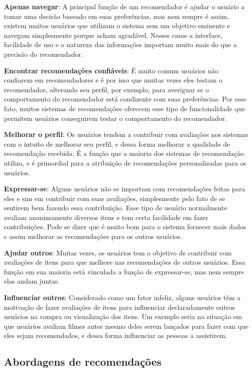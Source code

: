 \textbf{Apenas navegar}: A principal função de um recomendador é ajudar o usuário a tomar uma decisão baseado em suas preferências, mas nem sempre é assim, existem muitos usuários que utilizam o sistema sem um objetivo eminente e navegam simplesmente porque acham agradável. Nesses casos a interface, facilidade de uso e a natureza das informações importam muito mais do que a precisão do recomendador.

\textbf{Encontrar recomendações confiáveis}: É muito comum usuários não confiarem em recomendadores e é por isso que muitas vezes eles testam o recomendador, alterando seu perfil, por exemplo, para averiguar se o comportamento do recomendador está condizente com suas preferências. Por esse fato, muitos sistemas de recomendações oferecem esse tipo de funcionalidade que permitem usuários conseguirem testar o comportamento do recomendador.

\textbf{Melhorar o perfil}: Os usuários tendem a contribuir com avaliações nos sistemas com o intuito de melhorar seu perfil, e dessa forma melhorar a qualidade de recomendação recebida. É a função que a maioria dos sistemas de recomendação utiliza, e é primordial para a atribuição de recomendações personalizadas para os usuários.

\textbf{Expressar-se}: Alguns usuários não se importam com recomendações feitas para eles e sim em contribuir com suas avaliações, simplesmente pelo fato de se sentirem bem fazendo essa contribuição. Esse tipo de usuário normalmente avaliam anonimamente diversos itens e tem certa facilidade em fazer contribuições. Pode se dizer que é muito bom para o sistema fornecer mais dados e assim melhorar as recomendações para os outros usuários.

\textbf{Ajudar outros}: Muitas vezes, os usuários tem o objetivo de contribuir com avaliações de itens para que melhore nas recomendações de outros usuários. Essa função em sua maioria está vinculada a função de expressar-se, mas nem sempre elas andam juntas.

\textbf{Influenciar outros}: Considerado como um fator infeliz, alguns usuários têm a motivação de fazer avaliações de itens para influenciar declaradamente outros usuários na compra ou visualização dos itens. Um exemplo seria na situação em que usuários avaliam filmes antes mesmo deles serem lançados para fazer com que eles sejam recomendados,  e dessa forma influenciar as pessoas a assistirem.

\subsection{Abordagens de recomendações}

